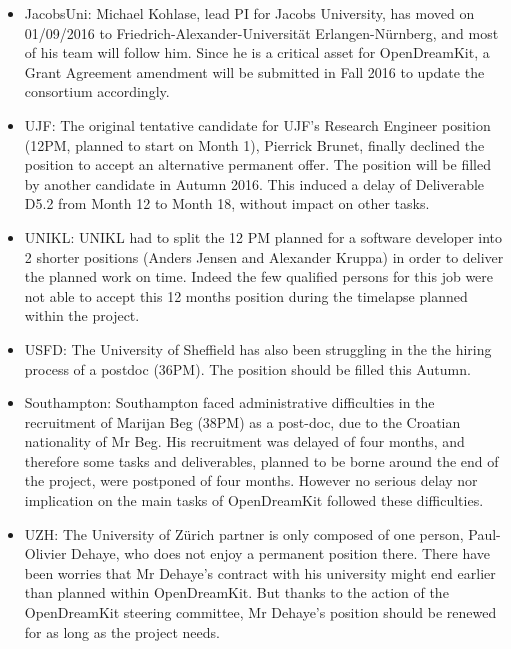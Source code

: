 \documentclass{deliverablereport}
\begin{document}
\begin{itemize}
\item{JacobsUni:} Michael Kohlase, lead PI for Jacobs University, has
  moved on 01/09/2016 to Friedrich-Alexander-Universität
  Erlangen-Nürnberg, and most of his team will follow him. Since he is
  a critical asset for OpenDreamKit, a Grant Agreement amendment will
  be submitted in Fall 2016 to update the consortium accordingly.\\

\item{UJF:} The original tentative candidate for UJF's Research
  Engineer position (12PM, planned to start on Month 1), Pierrick
  Brunet, finally declined the position to accept an alternative
  permanent offer. The position will be filled by another candidate in
  Autumn 2016. This induced a delay of Deliverable D5.2 from Month 12
  to Month 18, without impact on other tasks.\\

\item{UNIKL:} UNIKL had to split the 12 PM planned for a software developer into 2 shorter positions (Anders Jensen and Alexander Kruppa) in order to deliver the planned work on time. Indeed the few qualified persons for this job were not able to accept this 12 months position during the timelapse planned within the project.\\

\item{USFD:} The University of Sheffield has also been struggling in the the hiring process of a postdoc (36PM). The position should be filled this Autumn.\\

\item{Southampton:} Southampton faced administrative difficulties in the recruitment of Marijan Beg (38PM) as a post-doc, due to the Croatian nationality of Mr Beg. His recruitment was delayed of four months, and therefore some tasks and deliverables, planned to be borne around the end of the project, were postponed of four months. However no serious delay nor implication on the main tasks of OpenDreamKit followed these difficulties.\\

\item{UZH:} The University of Zürich partner is only composed of one person, Paul-Olivier Dehaye, who does not enjoy a permanent position there. There have been worries that Mr Dehaye's contract with his university might end earlier than planned within OpenDreamKit. But thanks to the action of the OpenDreamKit steering committee, Mr Dehaye's position should be renewed for as long as the project needs.\\


\end{itemize}
\end{document}
